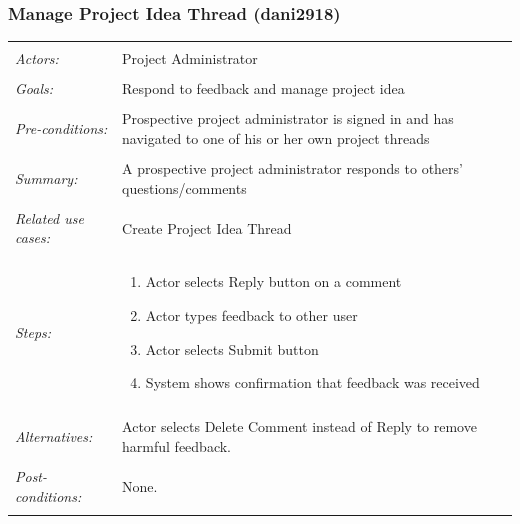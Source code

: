 \documentclass[11pt]{report}
\begin{document}
\subsubsection{Manage Project Idea Thread (dani2918)}
\begin{tabular}{ p{2cm} p{12cm} }
 \hline
 \\
 \textit{Actors:} & Project Administrator \\ 
 \\
 \textit{Goals:} & Respond to feedback and manage project idea  \\
 \\
 \textit{Pre-conditions:} & Prospective project administrator is signed in and has navigated to one of his or her own project threads  \\
 \\
 \textit{Summary:} &  A prospective project administrator responds to others' questions/comments \\ 
 \\
 \textit{Related use cases:} & Create Project Idea Thread \\ 
 \\
 \textit{Steps:} & \begin{enumerate}
  \item Actor selects Reply button on a comment
  \item Actor types feedback to other user
  \item Actor selects Submit button 
  \item System shows confirmation that feedback was received 
  
 \end{enumerate} \\
 \\
 \textit{Alternatives:} & Actor selects Delete Comment instead of Reply to remove harmful feedback. \\
 \\
 \textit{Post-conditions:} & None. \\
 \\
\hline
\end{tabular}
\end{document}
